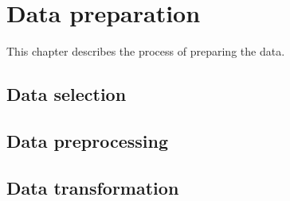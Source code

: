 \chapter{Data preparation}
This chapter describes the process of preparing the data.

\section{Data selection}
\section{Data preprocessing}
\section{Data transformation}
